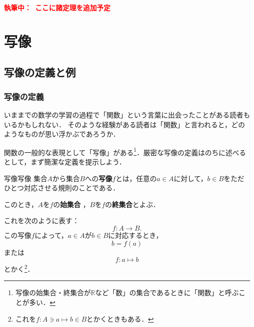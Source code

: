 \documentclass[a4paper,11pt]{ltjsarticle}
\renewcommand{\emph}[1]{\textbf{#1}}
\newcommand{\draftnote}[1]{\begin{center}\textbf{\textcolor{red}{執筆中：~#1}}\end{center}}
\begin{document}
\draftnote{ここに諸定理を追加予定}

\newpage
{}
\section{写像}

\subsection{写像の定義と例}

\subsubsection{写像の定義}

いままでの数学の学習の過程で「関数」という言葉に出会ったことがある読者もいるかもしれない．
そのような経験がある読者は「関数」と言われると，どのようなものが思い浮かぶであろうか．

関数の一般的な表現として「写像」がある\footnote{写像の始集合・終集合が$\mathbb{R}$など「数」の集合であるときに「関数」と呼ぶことが多い．}．厳密な写像の定義はのちに述べるとして，まず簡潔な定義を提示しよう．

\begin{definition}{写像}{写像}
  集合$A$から集合$B$への\emph{写像}$f$とは，任意の$a \in A$に対して，$b \in B$をただひとつ対応させる規則のことである．

  このとき，$A$を$f$の\emph{始集合} ，$B$を$f$の\emph{終集合}とよぶ．

  これを次のように表す：
  \[
    f \colon A \to B.
  \]
  この写像$f$によって，$a \in A$が$b \in B$に対応するとき，
  \[
    b=f(a)
  \]
  または
  \[
    f \colon a \mapsto b
  \]
  とかく\footnote{これを$ f \colon A \ni a \mapsto b \in B$とかくときもある．}．
\end{definition}
\end{document}
